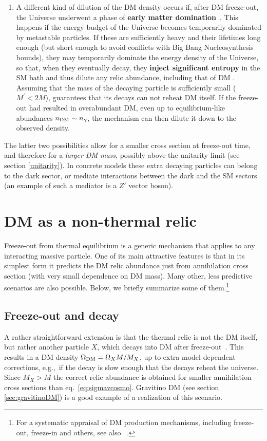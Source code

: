 \begin{enumerate}
\item A different kind of dilution of the DM density occurs if, after DM freeze-out, 
the Universe underwent a phase of {\bf early matter domination}~\cite{DM:entropy:injection}. 
This happens if the energy budget of the Universe becomes temporarily dominated by metastable particles. 
If these are sufficiently heavy and their lifetimes long enough (but short enough to avoid conflicts with Big Bang Nucleosynthesis bounds), they may temporarily dominate the energy density of the Universe, so that, when they eventually decay, they {\bf inject significant entropy} in the SM bath and thus dilute any relic abundance, including that of DM \cite{DM:entropy:injection}. Assuming that the mass of the decaying particle is sufficiently small ($M^\prime <2M$), guarantees that its decays can not reheat DM itself. If the freeze-out had resulted in overabundant DM, even up to equilibrium-like abundances $n_{\rm DM} \sim n_\gamma$, the mechanism can then dilute it down to the observed density.

\end{enumerate}
The latter two possibilities allow for a smaller cross section at freeze-out time, and therefore for a {\em larger DM mass}, possibly above the unitarity limit (see section \ref{unitarity}). In concrete models these extra decaying particles can belong to the dark sector, or mediate interactions between the dark and the SM sectors (an example of such a mediator is a $Z'$ vector boson).
 
 

\section{DM as a non-thermal relic}\label{sec:freeze-in}
Freeze-out from thermal equilibrium is a generic mechanism that applies to any interacting massive
particle. One of its main attractive features is that in its simplest form it predicts the DM relic abundance just from annihilation cross section (with very small dependence on DM mass).
Many other, less predictive scenarios are also possible.
Below, we briefly summarize some of them.\footnote{For a systematic appraisal of DM production mechanisms, including freeze-out, freeze-in and others, see also ~\cite{1112.0493}.}

\subsection{Freeze-out and decay}\label{sec:freezeoutdecay} 
A rather straightforward extension is that the thermal relic is not the DM itself, but rather another particle $X$, which decays 
into DM after freeze-out~\cite{SuperWIMP}. This results in a DM density $\Omega_{\rm DM} = \Omega _X M/M_X$, up 
to extra model-dependent corrections, e.g.,\ if the decay is slow enough that the decays reheat the universe. 
Since $M_X>M$ the correct relic abundance is obtained for smaller annihilation cross sections than eq.~\eqref{eq:sigmavcosmo}. Gravitino DM (see section \ref{sec:gravitinoDM}) is a good example of a realization of this scenario. 



